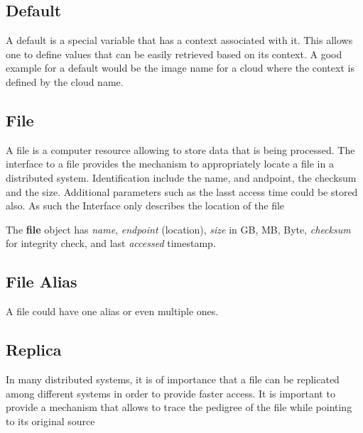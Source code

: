 \documentclass[9pt,twocolumn]{styles/osajnl}
\begin{document}

\subsection{Default}

A default is a special variable that has a context associated with
it. This allows one to define values that can be easily retrieved
based on its context. A good example for a default would be the image
name for a cloud where the context is defined by the cloud name.


\subsection{File}

A file is a computer resource allowing to store data that is being
processed. The interface to a file provides the mechanism to
appropriately locate a file in a distributed system. Identification
include the name, and andpoint, the checksum and the size. Additional
parameters such as the lasst access time could be stored also. As such
the Interface only describes the location of the file 

The \textbf{file} object has \textit{name}, \textit{endpoint} (location), \textit{size}
in GB, MB, Byte, \textit{checksum} for integrity check, and last
\textit{accessed} timestamp. 


\subsection{File Alias}

A file could have one alias or even multiple ones.


\subsection{Replica}

In many distributed systems, it is of importance that a file can be
replicated among different systems in order to provide faster
access. It is important to provide a mechanism that allows to trace
the pedigree of the file while pointing to its original source 
\end{document}
